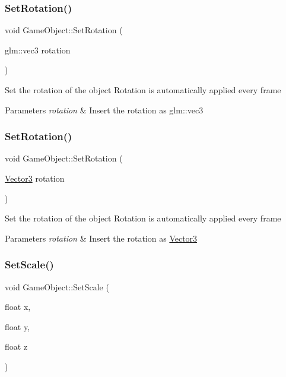\subsubsection{\texorpdfstring{SetRotation()}{SetRotation()}\hspace{0.1cm}{\footnotesize\ttfamily [2/3]}}
{\footnotesize\ttfamily void Game\+Object\+::\+Set\+Rotation (\begin{DoxyParamCaption}\item[{glm\+::vec3}]{rotation }\end{DoxyParamCaption})}

Set the rotation of the object Rotation is automatically applied every frame 
\begin{DoxyParams}{Parameters}
{\em rotation} & Insert the rotation as glm\+::vec3 \\
\hline
\end{DoxyParams}
\mbox{\label{class_game_object_a4f78a342f36f46e5113ae842bf626a6f}} 
\subsubsection{\texorpdfstring{SetRotation()}{SetRotation()}\hspace{0.1cm}{\footnotesize\ttfamily [3/3]}}
{\footnotesize\ttfamily void Game\+Object\+::\+Set\+Rotation (\begin{DoxyParamCaption}\item[{\mbox{\hyperlink{struct_vector3}{Vector3}}}]{rotation }\end{DoxyParamCaption})}

Set the rotation of the object Rotation is automatically applied every frame 
\begin{DoxyParams}{Parameters}
{\em rotation} & Insert the rotation as \mbox{\hyperlink{struct_vector3}{Vector3}} \\
\hline
\end{DoxyParams}
\mbox{\label{class_game_object_a28891c1985f80927b4b0633de8c67eac}} 
\subsubsection{\texorpdfstring{SetScale()}{SetScale()}\hspace{0.1cm}{\footnotesize\ttfamily [1/3]}}
{\footnotesize\ttfamily void Game\+Object\+::\+Set\+Scale (\begin{DoxyParamCaption}\item[{float}]{x,  }\item[{float}]{y,  }\item[{float}]{z }\end{DoxyParamCaption})}

